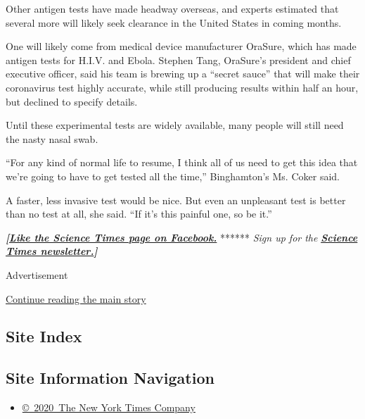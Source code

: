 Other antigen tests have made headway overseas, and experts estimated
that several more will likely seek clearance in the United States in
coming months.

One will likely come from medical device manufacturer OraSure, which has
made antigen tests for H.I.V. and Ebola. Stephen Tang, OraSure's
president and chief executive officer, said his team is brewing up a
``secret sauce'' that will make their coronavirus test highly accurate,
while still producing results within half an hour, but declined to
specify details.

Until these experimental tests are widely available, many people will
still need the nasty nasal swab.

``For any kind of normal life to resume, I think all of us need to get
this idea that we're going to have to get tested all the time,''
Binghamton's Ms. Coker said.

A faster, less invasive test would be nice. But even an unpleasant test
is better than no test at all, she said. ``If it's this painful one, so
be it.''

\textbf{\emph{{[}}\href{http://on.fb.me/1paTQ1h}{\emph{Like the Science
Times page on Facebook.}}} ****** \emph{\textbar{} Sign up for the}
\textbf{\href{http://nyti.ms/1MbHaRU}{\emph{Science Times
newsletter.}}\emph{{]}}}

Advertisement

\protect\hyperlink{after-bottom}{Continue reading the main story}

\hypertarget{site-index}{%
\subsection{Site Index}\label{site-index}}

\hypertarget{site-information-navigation}{%
\subsection{Site Information
Navigation}\label{site-information-navigation}}

\begin{itemize}
\tightlist
\item
  \href{https://help.nytimes3xbfgragh.onion/hc/en-us/articles/115014792127-Copyright-notice}{©~2020~The
  New York Times Company}
\end{itemize}

